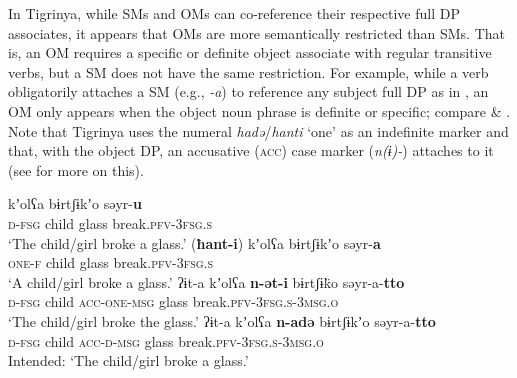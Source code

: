 \documentclass[output=paper]{langscibook}
\begin{document}
In Tigrinya, while SMs and OMs can co-reference their respective full DP associates, it appears that OMs are more semantically restricted than SMs. That is, an OM requires a specific or definite object associate with regular transitive verbs, but a SM does not have the same restriction.
For example, while a verb obligatorily attaches a SM (e.g., \emph{-a}) to reference any subject full DP as in , an OM only appears when the object noun phrase is definite or specific; compare  \& . Note that Tigrinya uses the numeral \emph{hadə}/\emph{hanti}  `one' as an indefinite marker and that, with the object DP, an accusative ({\scshape acc}) case marker (\emph{n(ɨ)-}) attaches to it (see  for more on this). 

\ea\label{ex:Gebregziabher:indefdef}
\ea\label{ex:Gebregziabher:dom1} 
 kʼolʕa bɨrtʃɨkʼo səyr-{\textbf{u}} \\
{\scshape d-fsg} child glass break.{\scshape pfv-3fsg.s}\\
\glt `The child/girl broke a glass.'
\ex\label{ex:Gebregziabher:dom2}
\gll ({\textbf{ħant-i}}) kʼolʕa bɨrtʃɨkʼo səyr-{\textbf{a}} \\
{\scshape one-f} child glass break.{\scshape pfv-3fsg.s}\\
\glt `A child/girl broke a glass.'
\z
\ex\label{ex:Gebregziabher:defdef}
\ea\label{ex:Gebregziabher:dom3} 
\gll ʔɨt-a kʼolʕa {\textbf{n-ət-i}} bɨrtʃɨk̈o səyr-a-{\textbf{tto}} \\
{\scshape d-fsg} child {\scshape acc-one-msg} glass break.{\scshape pfv-3fsg.s-3msg.o} \\
\glt `The child/girl broke the glass.'
\ex\label{ex:Gebregziabher:dom4}
\gll *ʔɨt-a kʼolʕa {\textbf{n-\textcrh adə}} bɨrtʃɨkʼo səyr-a-{\textbf{tto}} \\
{\scshape d-fsg} child {\scshape acc-d-msg} glass break.{\scshape pfv-3fsg.s-3msg.o}\\
\glt Intended: `The child/girl broke a glass.'
\z
\z
\end{document}
